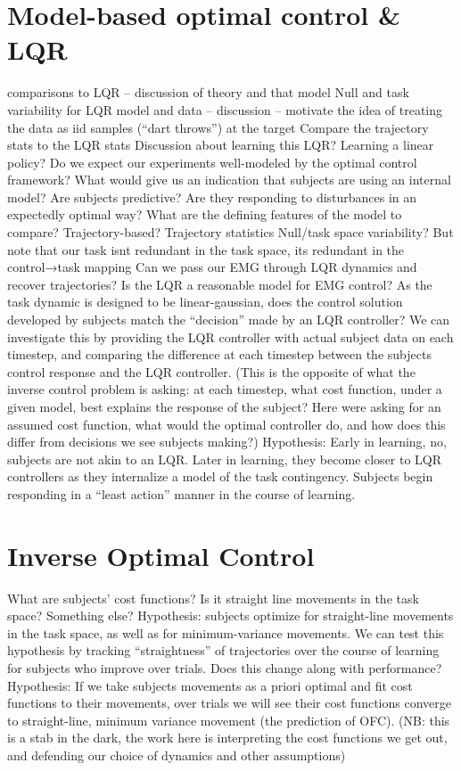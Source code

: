 \documentclass[../main.tex]{subfiles}
\begin{document}
\section{Model-based optimal control \& LQR}

comparisons to LQR – discussion of theory and that model
Null and task variability for LQR model and data – discussion – motivate the idea of treating the data as iid samples (“dart throws”) at the target
Compare the trajectory stats to the LQR stats
Discussion about learning this LQR? Learning a linear policy?
Do we expect our experiments well-modeled by the optimal control framework?
What would give us an indication that subjects are using an internal model? 
Are subjects predictive?
Are they responding to disturbances in an expectedly optimal way?
What are the defining features of the model to compare?
Trajectory-based? Trajectory statistics
Null/task space variability? But note that our task isnt redundant in the task space, its redundant in the control→task mapping
Can we pass our EMG through LQR dynamics and recover trajectories?
Is the LQR a reasonable model for EMG control? As the task dynamic is designed to be linear-gaussian, does the control solution developed by subjects match the “decision” made by an LQR controller? We can investigate this by providing the LQR controller with actual subject data on each timestep, and comparing the difference at each timestep between the subjects control response and the LQR controller. (This is the opposite of what the inverse control problem is asking: at each timestep, what cost function, under a given model, best explains the response of the subject? Here were asking for an assumed cost function, what would the optimal controller do, and how does this differ from decisions we see subjects making?)
Hypothesis: Early in learning, no, subjects are not akin to an LQR. Later in learning, they become closer to LQR controllers as they internalize a model of the task contingency. Subjects begin responding in a “least action” manner in the course of learning.

\section{Inverse Optimal Control}
What are subjects' cost functions? Is it straight line movements in the task space? Something else?
Hypothesis: subjects optimize for straight-line movements in the task space, as well as for minimum-variance movements. We can test this hypothesis by tracking “straightness” of trajectories over the course of learning for subjects who improve over trials. Does this change along with performance? 
Hypothesis: If we take subjects movements as a priori optimal and fit cost functions to their movements, over trials we will see their cost functions converge to straight-line, minimum variance movement (the prediction of OFC). (NB: this is a stab in the dark, the work here is interpreting the cost functions we get out, and defending our choice of dynamics and other assumptions)
\end{document}
